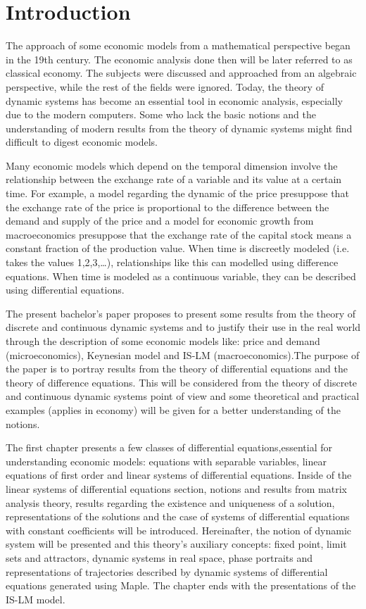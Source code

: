 \documentclass[a4paper, 11pt]{report}
\begin{document}
\chapter*{Introduction}
 The approach of some economic models from a mathematical perspective began in the 19th century. The economic analysis done then will be later referred to as classical economy. The subjects were discussed and approached from an algebraic perspective, while the rest of the fields were ignored. Today, the theory of dynamic systems has become an essential tool in economic analysis, especially due to the modern computers. Some who lack the basic notions and the understanding of modern results from the theory of dynamic systems might find difficult to digest economic models. \par
 Many economic models which depend on the temporal dimension involve the relationship between the exchange rate of a variable and its value at a certain time. For example, a model regarding the dynamic of the price presuppose that the exchange rate of the price is proportional to the difference between the demand and supply of the price and a model for economic growth from macroeconomics presuppose that the exchange rate of the capital stock means a constant fraction of the production value. When time is discreetly modeled (i.e. takes the values 1,2,3,…), relationships like this can modelled using difference equations. When time is modeled as a continuous variable, they can be described using differential equations.\par 
The present bachelor’s paper proposes to present some results from the theory of discrete and continuous dynamic systems and to justify their use in the real world through the description of some economic models like: price and demand (microeconomics), Keynesian model and IS-LM (macroeconomics).The purpose of the paper is to portray results from the theory of differential equations and the theory of difference equations. This will be considered from the theory of discrete and continuous dynamic systems point of view and some theoretical and practical examples (applies in economy) will be given for a better understanding of the notions.\par
The first chapter presents a few classes of differential equations,essential for understanding economic models: equations with separable variables, linear equations of first order and linear systems of differential equations. Inside of the linear systems of differential equations section, notions and results from matrix analysis theory, results regarding the existence and uniqueness of a solution, representations of the solutions and the case of systems of differential equations with constant coefficients will be introduced. Hereinafter, the notion of dynamic system will be presented and this theory’s auxiliary concepts: fixed point, limit sets and attractors, dynamic systems in real space, phase portraits and representations of trajectories described by  dynamic systems of differential equations generated using Maple. The chapter ends with the presentations of the IS-LM model.\par
\end{document}
